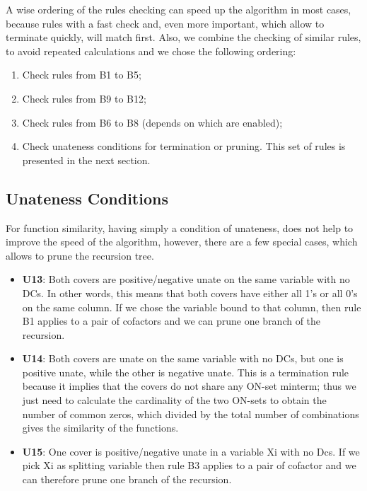 \documentclass{acm_proc_article-sp}
\begin{document}
A wise ordering of the rules checking can speed up the algorithm in most cases,
because rules with a fast check and, even more important, which allow to terminate
quickly, will match first. Also, we combine the checking of similar rules, to
avoid repeated calculations and we chose the following ordering:
\begin{enumerate}
  \item Check rules from B1 to B5;
  \item Check rules from B9 to B12;
  \item Check rules from B6 to B8 (depends on which are enabled);
  \item Check unateness conditions for termination or pruning. This set of rules
    is presented in the next section.
\end{enumerate}

\subsection{Unateness Conditions}

For function similarity, having simply a condition of unateness, does not help to
improve the speed of the algorithm, however, there are a few special cases, which
allows to prune the recursion tree.

\begin{itemize}
  \item {\bf U13}: Both covers are positive/negative unate on the same variable with
    no DCs. In other words, this means that both covers have either all 1's or all
    0's on the same column. If we chose the variable bound to that column, then
    rule B1 applies to a pair of cofactors and we can prune one branch of the
    recursion.
  \item {\bf U14}: Both covers are unate on the same variable with no DCs, but one
    is positive unate, while the other is negative unate. This is a termination rule
    because it implies that the covers do not share any ON-set minterm; thus we just
    need to calculate the cardinality of the two ON-sets to obtain the number of
    common zeros, which divided by the total number of combinations gives the
    similarity of the functions.
  \item {\bf U15}: One cover is positive/negative unate in a variable Xi with no Dcs.
    If we pick Xi as splitting variable then rule B3 applies to a pair of cofactor
    and we can therefore prune one branch of the recursion.
\end{itemize}
\end{document}
